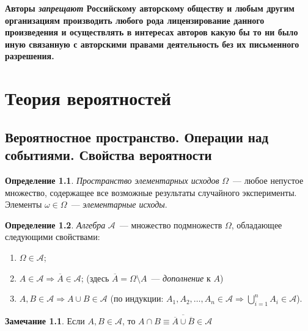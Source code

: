 \documentclass[oneside,final,14pt]{extreport}
\theoremstyle{plain}
\theoremstyle{definition}
\newtheorem*{defn}{Определение}
\newtheorem*{rmrk}{Замечание}
\theoremstyle{named}
\begin{document}
\vspace{1cm}

\textbf{Авторы \textit{запрещают} Российскому авторскому обществу и любым другим организациям производить любого рода лицензирование данного произведения и осуществлять в интересах авторов какую бы то ни было иную связанную с авторскими правами деятельность без их письменного разрешения.}

\tableofcontents %

\chapter{Теория вероятностей}

\section{Вероятностное пространство. Операции над событиями. Свойства вероятности}
\begin{defn}
    {\it Пространство элементарных исходов} $\Omega$~--- любое непустое множество, содержащее все возможные результаты случайного эксперименты. Элементы $\omega \in \Omega$~--- {\it элементарные исходы}.
\end{defn}

\begin{defn}
{\it Алгебра} $\mathcal{A}$~--- множество подмножеств $\Omega$, обладающее следующими свойствами:

\begin{enumerate}
    \item $\Omega \in \mathcal{A}$;
    \item $A \in \mathcal{A} \Rightarrow \overline{A} \in \mathcal{A}$; (здесь $\overline{A} = \Omega \setminus A$~--- {\it дополнение} к $A$)
    \item $A, B \in \mathcal{A} \Rightarrow A \cup B \in \mathcal{A}$ (по индукции: $A_1, A_2, \ldots, A_n \in \mathcal{A} \Rightarrow \bigcup\limits_{i=1}^n A_i \in \mathcal{A}$).
\end{enumerate}
\end{defn}

\begin{rmrk}
    Если $A, B \in \mathcal{A}$, то $A \cap B \equiv \overline{\overline{A} \cup \overline{B}} \in \mathcal{A}$
\end{rmrk}
\end{document}
